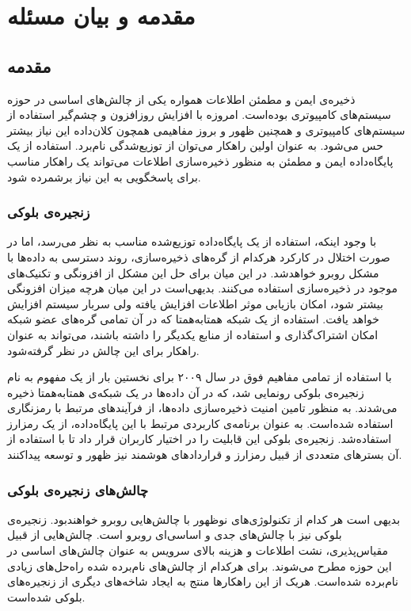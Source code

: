 
\chapter{مقدمه و بیان مسئله}
\section{مقدمه}
ذخیره‌ی ایمن و مطمئن اطلاعات همواره یکی از چالش‌های اساسی در حوزه سیستم‌های کامپیوتری بوده‌است. امروزه با افزایش روزافزون و چشم‌گیر استفاده از سیستم‌های کامپیوتری و همچنین ظهور و بروز مفاهیمی همچون کلان‌داده این نیاز بیشتر حس می‌شود. به عنوان اولین راهکار می‌توان از توزیع‌شدگی نام‌برد. استفاده از یک پایگاه‌داده ایمن و مطمئن به منظور ذخیره‌سازی اطلاعات می‌تواند یک راهکار مناسب برای پاسخگویی به این نیاز برشمرده شود.

\subsection{زنجیره‌ی بلوکی}
با وجود اینکه، استفاده از یک پایگاه‌داده توزیع‌شده مناسب به نظر می‌رسد، اما در صورت اختلال در کارکرد هرکدام از گره‌های ذخیره‌سازی، روند دسترسی به داده‌ها با مشکل روبرو خواهدشد. در این میان برای حل این مشکل از افزونگی و تکنیک‌های موجود در ذخیره‌سازی استفاده می‌کنند. بدیهی‌است در این میان هرچه میزان افزونگی بیشتر شود، امکان بازیابی موثر اطلاعات افزایش یافته ولی سربار سیستم افزایش خواهد یافت. استفاده از یک شبکه همتا‌به‌همتا که در آن تمامی گره‌های عضو شبکه امکان اشتراک‌گذاری و استفاده از منابع یکدیگر را داشته باشند، می‌تواند به عنوان راهکار برای این چالش در نظر گرفته‌شود.


با استفاده از تمامی مفاهیم فوق در سال ۲۰۰۹ برای نخستین بار از یک مفهوم به نام زنجیره‌ی بلوکی رونمایی شد، که در آن داده‌ها در یک شبکه‌ی همتا‌به‌همتا ذخیره‌ می‌شدند. به منظور تامین امنیت ذخیره‌سازی داده‌ها، از فرآیند‌های مرتبط با رمزنگاری استفاده شده‌است. به عنوان برنامه‌ی کاربردی مرتبط با این پایگاه‌داده، از یک رمزارز استفاده‌شد. زنجیره‌ی بلوکی این قابلیت را در اختیار کاربران قرار داد تا با استفاده از آن بسترهای متعددی از قبیل رمزارز و قراردادهای هوشمند نیز ظهور و توسعه پیدا‌کنند.
\subsection{چالش‌های زنجیره‌ی بلوکی}
بدیهی است هر کدام از تکنولوژی‌های نوظهور با چالش‌هایی روبرو خواهندبود. زنجیره‌ی بلوکی نیز با چالش‌های جدی و اساسی‌ای روبرو است. چالش‌هایی از قبیل مقیاس‌پذیری، نشت اطلاعات و هزینه بالای سرویس به عنوان چالش‌های اساسی در این حوزه مطرح می‌شوند. برای هرکدام از چالش‌های نام‌برده شده راه‌حل‌های زیادی نام‌برده شده‌است. هریک از این راهکارها منتج به ایجاد شاخه‌های دیگری از زنجیره‌های بلوکی شده‌است.


